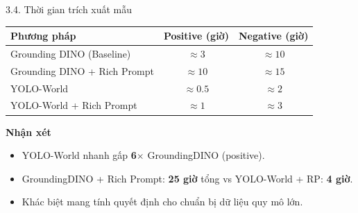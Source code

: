 \documentclass[11pt]{beamer}
\begin{document}
\begin{frame}{3.4. Thời gian trích xuất mẫu}
\scriptsize

\centering
\renewcommand{\arraystretch}{1.3}
\begin{tabular}{|l|c|c|}
\hline
\rowcolor{uitblue!15}
\textbf{Phương pháp} & \textbf{Positive (giờ)} & \textbf{Negative (giờ)} \\
\hline
Grounding DINO (Baseline) & $\approx 3$ & $\approx 10$ \\
\hline
Grounding DINO + Rich Prompt & $\approx 10$ & $\approx 15$ \\
\hline
\rowcolor{green!8} YOLO-World & $\approx 0.5$ & $\approx 2$ \\
\hline
\rowcolor{green!8} YOLO-World + Rich Prompt & $\approx 1$ & $\approx 3$ \\
\hline
\end{tabular}

\vspace{0.5em}

\begin{block}{\textbf{Nhận xét}}
\begin{itemize}
  \item YOLO-World nhanh gấp \textbf{6$\times$} GroundingDINO (positive).
  \item GroundingDINO + Rich Prompt: \textbf{25 giờ} tổng vs YOLO-World + RP: \textbf{4 giờ}.
  \item Khác biệt mang tính quyết định cho chuẩn bị dữ liệu quy mô lớn.
\end{itemize}
\end{block}

\end{frame}
\end{document}
